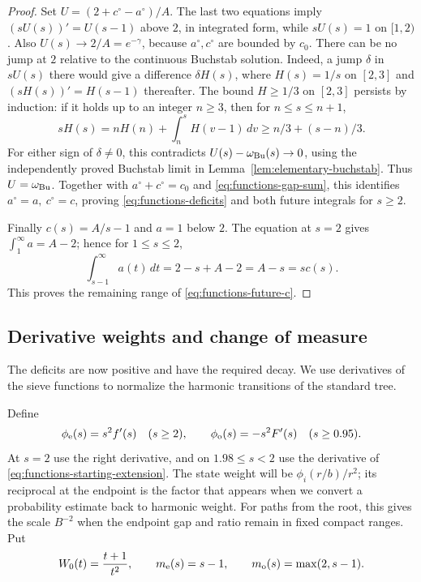 \begin{proof}
Set \(U=(2+c^\circ-a^\circ)/A\).  The last two equations imply
\((sU(s))'=U(s-1)\) above \(2\), in integrated form, while
\(sU(s)=1\) on \([1,2)\).
Also \(U(s)\to 2/A=e^{-\gamma}\), because \(a^\circ,c^\circ\)
are bounded by \(c_0\).
There can be no jump at \(2\) relative to the continuous Buchstab
solution.  Indeed, a jump \(\delta\) in \(sU(s)\) there would give
a difference \(\delta H(s)\), where \(H(s)=1/s\) on \([2,3]\) and
\((sH(s))'=H(s-1)\) thereafter.  The bound \(H\ge1/3\) on
\([2,3]\) persists by induction: if it holds up to an integer \(n\ge3\),
then for \(n\le s\le n+1\),
\[
 sH(s)=nH(n)+\int_n^s H(v-1)\,dv\ge n/3+(s-n)/3.
\]
For either sign of \(\delta\ne0\), this contradicts
\(U(s)-\omega_{\rm Bu}(s)\to0\), using the independently proved Buchstab limit in
Lemma~\ref{lem:elementary-buchstab}.
Thus \(U=\omega_{\rm Bu}\).  Together with
\(a^\circ+c^\circ=c_0\) and \eqref{eq:functions-gap-sum}, this identifies
\(a^\circ=a,\ c^\circ=c\), proving
\eqref{eq:functions-deficits} and both future integrals for \(s\ge2\).

Finally \(c(s)=A/s-1\) and \(a=1\) below \(2\).
The equation at \(s=2\) gives
\(\int_1^\infty a=A-2\); hence for \(1\le s\le2\),
\[
 \int_{s-1}^{\infty}a(t)\,dt=2-s+A-2=A-s=s c(s).
\]
This proves the remaining range of \eqref{eq:functions-future-c}.
\end{proof}
\subsection{Derivative weights and change of measure}

The deficits are now positive and have the required decay.  We use
derivatives of the sieve functions to normalize the harmonic transitions
of the standard tree.

Define
\[
 \phi_\mathrm e(s)=s^2f'(s)\quad(s\ge2),\qquad
 \phi_\mathrm o(s)=-s^2F'(s)\quad(s\ge0.95).
\]
At \(s=2\) use the right derivative, and on \(1.98\le s<2\) use
the derivative of \eqref{eq:functions-starting-extension}.
The state weight will be \(\phi_i(r/b)/r^2\); its reciprocal at the
endpoint is the factor that appears when we convert a probability
estimate back to harmonic weight.  For paths from the root, this gives
the scale \(B^{-2}\) when the endpoint gap and ratio remain in fixed
compact ranges.
Put
\[
 W_0(t)=\frac{t+1}{t^2},\qquad
 m_\mathrm e(s)=s-1,\qquad m_\mathrm o(s)=\max(2,s-1).
\]


